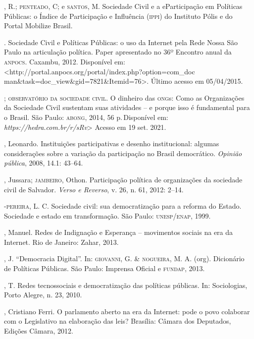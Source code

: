 \begin{bibliohedra}
, R.; \textsc{penteado}, C; e \textsc{santos}, M. Sociedade Civil e a eParticipação
em Políticas Públicas: o Índice de Participação e Influência (\textsc{ippi}) do
Instituto Pólis e do Portal Mobilize Brasil.

\titidem.
Sociedade Civil e Políticas Públicas: o uso da Internet pela Rede Nossa
São Paulo na articulação política. Paper apresentado no 36º Encontro
anual da \textsc{anpocs}. Caxambu, 2012. Disponível em:
\textless{}http://portal.anpocs.org/portal/index.php?option=com\_doc %
man\&task=doc\_view\&gid=7821\&Itemid=76\textgreater{}. Último acesso em
05/04/2015.

; \textsc{observatório
da sociedade civil}. O dinheiro das \textsc{ong}s: Como as Organizações da
Sociedade Civil sustentam suas atividades -- e porque isso é fundamental
para o Brasil. São Paulo: \textsc{abong}, 2014, 56 p.\,Disponível em:
\emph{https://hedra.com.br/r/sRv}>
Acesso em 19 set. 2021.

, Leonardo. Instituições participativas e desenho institucional:
algumas considerações sobre a variação da participação no Brasil
democrático. \emph{Opinião pública}, 2008, 14.1: 43--64.

, Jussara; \textsc{jambeiro}, Othon. Participação política de organizações
da sociedade civil de Salvador. \emph{Verso e Reverso}, v. 26, n. 61,
2012: 2--14.

-\textsc{pereira}, L. C. Sociedade civil: sua democratização para a
reforma do Estado. Sociedade e estado em transformação. São Paulo:
\textsc{unesp}/\textsc{enap}, 1999.

, Manuel. Redes de Indignação e Esperança -- movimentos sociais
na era da Internet. Rio de Janeiro: Zahar, 2013.

, J. ``Democracia Digital''. In: \textsc{giovanni}, G. \& \textsc{nogueira}, M. A.
(org). Dicionário de Políticas Públicas. São Paulo: Imprensa Oficial e
\textsc{fundap}, 2013.

, T. Redes tecnossociais e democratização das políticas públicas.
In: Sociologias, Porto Alegre, n. 23, 2010.

, Cristiano Ferri. O parlamento aberto na era da Internet: pode o
povo colaborar com o Legislativo na elaboração das leis? Brasília:
Câmara dos Deputados, Edições Câmara, 2012.


\end{bibliohedra}

